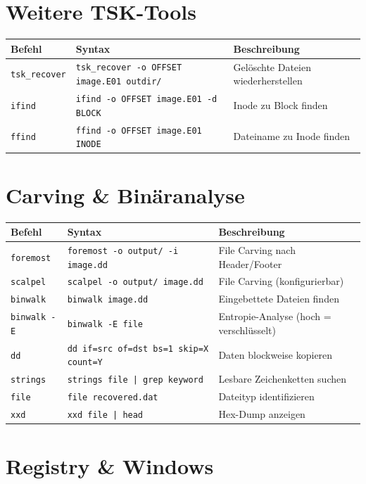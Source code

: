 \section{Weitere TSK-Tools}

{\small
\begin{tabular}{@{}p{2.2cm} p{7.8cm} p{4.5cm}@{}}
\toprule
\textbf{Befehl} & \textbf{Syntax} & \textbf{Beschreibung} \\
\midrule
\texttt{tsk\_recover} & \texttt{tsk\_recover -o OFFSET image.E01 outdir/} & Gelöschte Dateien wiederherstellen \\
\texttt{ifind} & \texttt{ifind -o OFFSET image.E01 -d BLOCK} & Inode zu Block finden \\
\texttt{ffind} & \texttt{ffind -o OFFSET image.E01 INODE} & Dateiname zu Inode finden \\
\bottomrule
\end{tabular}
}

\section{Carving \& Binäranalyse}

{\small
\begin{tabular}{@{}p{2.2cm} p{7.8cm} p{4.5cm}@{}}
\toprule
\textbf{Befehl} & \textbf{Syntax} & \textbf{Beschreibung} \\
\midrule
\texttt{foremost} & \texttt{foremost -o output/ -i image.dd} & File Carving nach Header/Footer \\
\texttt{scalpel} & \texttt{scalpel -o output/ image.dd} & File Carving (konfigurierbar) \\
\texttt{binwalk} & \texttt{binwalk image.dd} & Eingebettete Dateien finden \\
\texttt{binwalk -E} & \texttt{binwalk -E file} & Entropie-Analyse (hoch = verschlüsselt) \\
\texttt{dd} & \texttt{dd if=src of=dst bs=1 skip=X count=Y} & Daten blockweise kopieren \\
\texttt{strings} & \texttt{strings file | grep keyword} & Lesbare Zeichenketten suchen \\
\texttt{file} & \texttt{file recovered.dat} & Dateityp identifizieren \\
\texttt{xxd} & \texttt{xxd file | head} & Hex-Dump anzeigen \\
\bottomrule
\end{tabular}
}

\section{Registry \& Windows}

